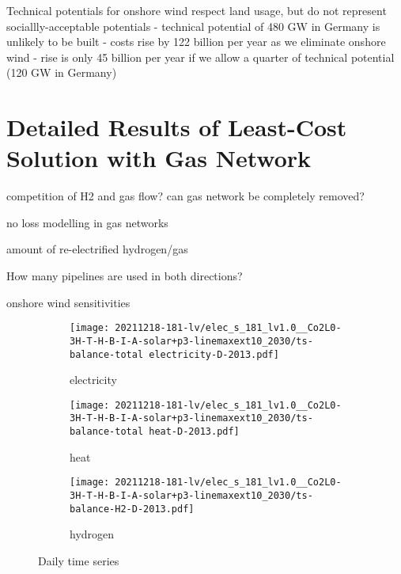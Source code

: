 Technical potentials for onshore wind respect land usage, but do not represent
sociallly-acceptable potentials
- technical potential of 480 GW in Germany is unlikely to be built
- costs rise by 122 billion per year as we eliminate onshore wind
- rise is only 45 billion per year if we allow a quarter of technical potential (120 GW in Germany)

\section{Detailed Results of Least-Cost Solution with Gas Network}
\label{sec:si:detailed}

competition of H2 and gas flow? can gas network be completely removed?

no loss modelling in gas networks

amount of re-electrified hydrogen/gas

How many pipelines are used in both directions?

onshore wind sensitivities



\begin{figure}
    \centering
    \begin{subfigure}[t]{\textwidth}
        \centering
        \caption{electricity}
        \texttt{[image: 20211218-181-lv/elec\_s\_181\_lv1.0\_\_Co2L0-3H-T-H-B-I-A-solar+p3-linemaxext10\_2030/ts-balance-total electricity-D-2013.pdf]}
    \end{subfigure}
    \begin{subfigure}[t]{\textwidth}
        \centering
        \caption{heat}
        \texttt{[image: 20211218-181-lv/elec\_s\_181\_lv1.0\_\_Co2L0-3H-T-H-B-I-A-solar+p3-linemaxext10\_2030/ts-balance-total heat-D-2013.pdf]}
    \end{subfigure}
    \begin{subfigure}[t]{\textwidth}
        \centering
        \caption{hydrogen}
        \texttt{[image: 20211218-181-lv/elec\_s\_181\_lv1.0\_\_Co2L0-3H-T-H-B-I-A-solar+p3-linemaxext10\_2030/ts-balance-H2-D-2013.pdf]}
    \end{subfigure}
    \caption{Daily time series}
    \label{fig:output-ts-1}
\end{figure}

